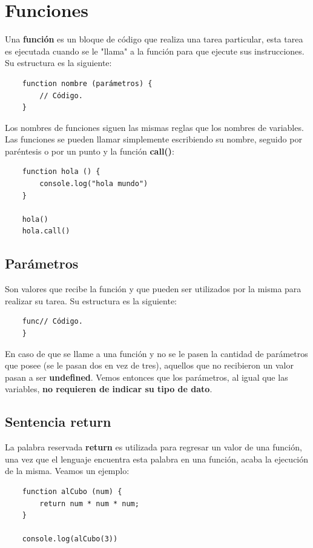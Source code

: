\section{Funciones}

Una \textbf{función} es un bloque de código que realiza una tarea particular, esta tarea es ejecutada cuando se le "llama" a la función para que ejecute sus instrucciones. Su estructura es la siguiente:
\begin{lstlisting}
    function nombre (parámetros) {
        // Código.
    }
\end{lstlisting}

Los nombres de funciones siguen las mismas reglas que los nombres de variables. Las funciones se pueden llamar simplemente escribiendo su nombre, seguido por paréntesis o por un punto y la función \textbf{call()}:
\begin{lstlisting}
    function hola () {
        console.log("hola mundo")
    }

    hola()
    hola.call()
\end{lstlisting}


\subsection{Parámetros}

Son valores que recibe la función y que pueden ser utilizados por la misma para realizar su tarea. Su estructura es la siguiente:
\begin{lstlisting}
    func// Código.
    }
\end{lstlisting}

En caso de que se llame a una función y no se le pasen la cantidad de parámetros que posee (se le pasan dos en vez de tres), aquellos que no recibieron un valor pasan a ser \textbf{undefined}. Vemos entonces que los parámetros, al igual que las variables, \textbf{no requieren de indicar su tipo de dato}.


\subsection{Sentencia return}

La palabra reservada \textbf{return} es utilizada para regresar un valor de una función, una vez que el lenguaje encuentra esta palabra en una función, acaba la ejecución de la misma. Veamos un ejemplo:
\begin{lstlisting}
    function alCubo (num) {
        return num * num * num;
    }

    console.log(alCubo(3))
\end{lstlisting}

